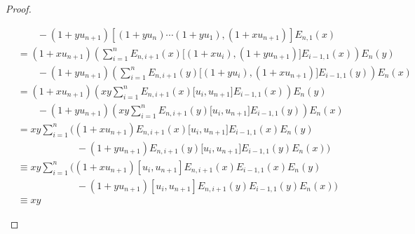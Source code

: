 \documentclass{article}
\begin{document}
\begin{proof}
\begin{landscape}
\begin{align*}
            &\qquad-
            (1+yu_{n+1})
            \left[
                (1+yu_n)\cdots(1+yu_1),(1+xu_{n+1})
            \right]
            E_{n,1}(x)
            \\
            &=
            (1+xu_{n+1})
            \left(
                \sum_{i=1}^n
                E_{n,i+1}(x)
                \big[
                    (1+xu_i),(1+yu_{n+1})
                \big]
                E_{i-1,1}(x)
            \right)
            E_n(y)
            \\
            &\qquad-
            (1+yu_{n+1})
            \left(
                \sum_{i=1}^n
                E_{n,i+1}(y)
                \big[
                    (1+yu_i),(1+xu_{n+1})
                \big]
                E_{i-1,1}(y)
            \right)
            E_n(x)
            \\
            &=
            (1+xu_{n+1})
            \left(
                xy
                \sum_{i=1}^n
                E_{n,i+1}(x)
                \big[
                    u_i,u_{n+1}
                \big]
                E_{i-1,1}(x)
            \right)
            E_n(y)
            \\
            &\qquad-
            (1+yu_{n+1})
            \left(
                xy
                \sum_{i=1}^n
                E_{n,i+1}(y)
                \big[
                    u_i,u_{n+1}
                \big]
                E_{i-1,1}(y)
            \right)
            E_n(x)
            \\
            &=
            xy
            \sum_{i=1}^n
            \Bigg(
            (1+xu_{n+1})
            E_{n,i+1}(x)
            \big[
                u_i,u_{n+1}
            \big]
            E_{i-1,1}(x)E_n(y)
            \\
            &\hspace{6em}-
            (1+yu_{n+1})
            E_{n,i+1}(y)
            \big[
                u_i,u_{n+1}
            \big]
            E_{i-1,1}(y)E_n(x)
            \Bigg)
            \\
            &\equiv
            xy
            \sum_{i=1}^n
            \Bigg(
            (1+xu_{n+1})
            [u_i,u_{n+1}]
            E_{n,i+1}(x)E_{i-1,1}(x)E_n(y)
            \\
            &\hspace{6em}-
            (1+yu_{n+1})
            [u_i,u_{n+1}]
            E_{n,i+1}(y)E_{i-1,1}(y)E_n(x)
            \Bigg)
            \\
            &\equiv
            xy

\end{align*}
\end{landscape}
\end{proof}
\end{document}

